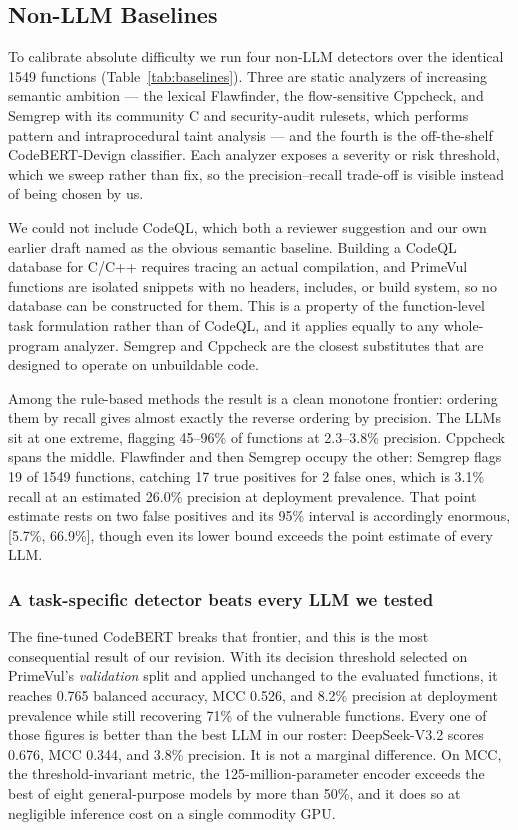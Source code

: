 \documentclass[computers,article,submit,moreauthors]{Definitions/mdpi}
\begin{document}
\subsection{Non-LLM Baselines}\label{sec:baselines}
To calibrate absolute difficulty we run four non-LLM detectors over the identical 1549 functions (Table~\ref{tab:baselines}). Three are static analyzers of increasing semantic ambition --- the lexical Flawfinder, the flow-sensitive Cppcheck, and Semgrep with its community C and security-audit rulesets, which performs pattern and intraprocedural taint analysis --- and the fourth is the off-the-shelf CodeBERT-Devign classifier. Each analyzer exposes a severity or risk threshold, which we sweep rather than fix, so the precision--recall trade-off is visible instead of being chosen by us.

We could not include CodeQL, which both a reviewer suggestion and our own earlier draft named as the obvious semantic baseline. Building a CodeQL database for C/C++ requires tracing an actual compilation, and PrimeVul functions are isolated snippets with no headers, includes, or build system, so no database can be constructed for them. This is a property of the function-level task formulation rather than of CodeQL, and it applies equally to any whole-program analyzer. Semgrep and Cppcheck are the closest substitutes that are designed to operate on unbuildable code.

Among the rule-based methods the result is a clean monotone frontier: ordering them by recall gives almost exactly the reverse ordering by precision. The LLMs sit at one extreme, flagging 45--96\% of functions at 2.3--3.8\% precision. Cppcheck spans the middle. Flawfinder and then Semgrep occupy the other: Semgrep flags 19 of 1549 functions, catching 17 true positives for 2 false ones, which is 3.1\% recall at an estimated 26.0\% precision at deployment prevalence. That point estimate rests on two false positives and its 95\% interval is accordingly enormous, [5.7\%, 66.9\%], though even its lower bound exceeds the point estimate of every LLM.

\subsubsection*{A task-specific detector beats every LLM we tested}
The fine-tuned CodeBERT breaks that frontier, and this is the most consequential result of our revision. With its decision threshold selected on PrimeVul's \emph{validation} split and applied unchanged to the evaluated functions, it reaches 0.765 balanced accuracy, MCC 0.526, and 8.2\% precision at deployment prevalence while still recovering 71\% of the vulnerable functions. Every one of those figures is better than the best LLM in our roster: DeepSeek-V3.2 scores 0.676, MCC 0.344, and 3.8\% precision. It is not a marginal difference. On MCC, the threshold-invariant metric, the 125-million-parameter encoder exceeds the best of eight general-purpose models by more than 50\%, and it does so at negligible inference cost on a single commodity GPU.
\end{document}
